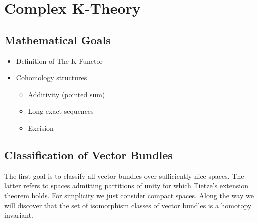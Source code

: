 \section{Complex K-Theory}
\subsection{Mathematical Goals}


\begin{theorem}
	
	\begin{itemize}
		\item Definition of The K-Functor 
		\item Cohomology structures
			\begin{itemize}
				\item Additivity (pointed sum)
				\item Long exact sequences
				\item Excision
			\end{itemize}
	\end{itemize}
\end{theorem}
\subsection{Classification of Vector Bundles}
The first goal is to classify all vector bundles over sufficiently nice spaces. The latter refers to spaces admitting partitions of unity for which Tietze's extension theorem holds. For simplicity we just consider compact spaces. Along the way we will discover that the set of isomorphism classes of vector bundles is a homotopy invariant.


